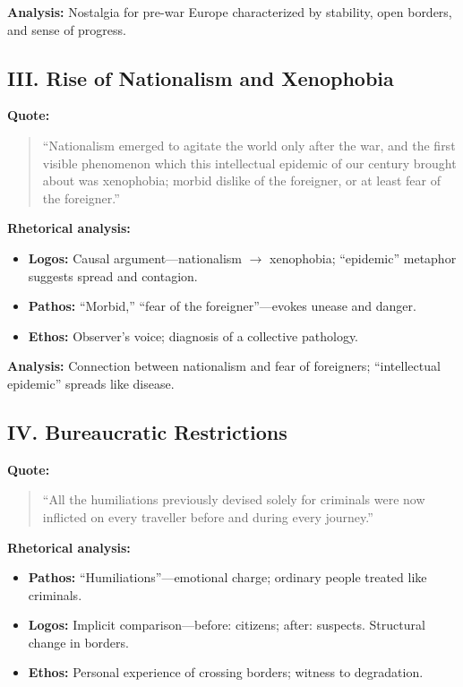 \documentclass[11pt,a4paper]{article}
\begin{document}
\textbf{Analysis:} Nostalgia for pre-war Europe characterized by stability, open borders, and sense of progress.

\subsection*{III. Rise of Nationalism and Xenophobia}

\textbf{Quote:}
\begin{quote}
``Nationalism emerged to agitate the world only after the war, and the first visible phenomenon which this intellectual epidemic of our century brought about was xenophobia; morbid dislike of the foreigner, or at least fear of the foreigner.''
\end{quote}

\textbf{Rhetorical analysis:}
\begin{itemize}
\item \textbf{Logos:} Causal argument---nationalism $\to$ xenophobia; ``epidemic'' metaphor suggests spread and contagion.
\item \textbf{Pathos:} ``Morbid,'' ``fear of the foreigner''---evokes unease and danger.
\item \textbf{Ethos:} Observer's voice; diagnosis of a collective pathology.
\end{itemize}

\textbf{Analysis:} Connection between nationalism and fear of foreigners; ``intellectual epidemic'' spreads like disease.

\subsection*{IV. Bureaucratic Restrictions}

\textbf{Quote:}
\begin{quote}
``All the humiliations previously devised solely for criminals were now inflicted on every traveller before and during every journey.''
\end{quote}

\textbf{Rhetorical analysis:}
\begin{itemize}
\item \textbf{Pathos:} ``Humiliations''---emotional charge; ordinary people treated like criminals.
\item \textbf{Logos:} Implicit comparison---before: citizens; after: suspects. Structural change in borders.
\item \textbf{Ethos:} Personal experience of crossing borders; witness to degradation.
\end{itemize}
\end{document}
